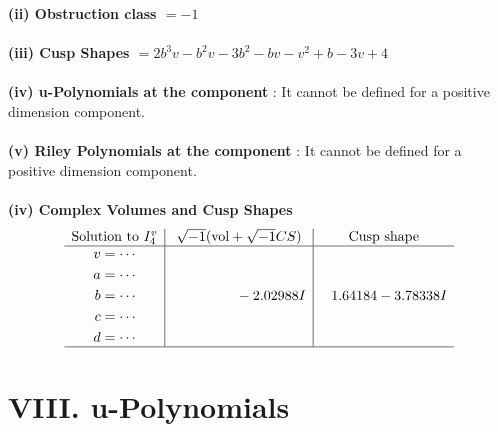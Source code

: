 \documentclass[1p]{elsarticle_modified}
\theoremstyle{definition}
\newcommand{\I}{\sqrt{-1}}
\begin{document}
\flushleft \textbf{(ii) Obstruction class $= -1$}\\~\\
\flushleft \textbf{(iii) Cusp Shapes $= 2 b^3 v- b^2 v-3 b^2- b v- v^2+b-3 v+4$}\\~\\
\flushleft \textbf{(iv) u-Polynomials at the component} : It cannot be defined for a positive dimension component.\\~\\
\flushleft \textbf{(v) Riley Polynomials at the component} : It cannot be defined for a positive dimension component.\\~\\
\newpage\flushleft \textbf{(iv) Complex Volumes and Cusp Shapes}
$$\begin{array}{c|c|c} 
\text{Solution to }I^v_{4}& \I (\text{vol} + \sqrt{-1}CS) & \text{Cusp shape}\\
 \hline 
\begin{aligned}
v &= \cdots \\
a &= \cdots \\
b &= \cdots \\
c &= \cdots \\
d &= \cdots\end{aligned}
 & \phantom{-0.000000 } -2.02988 I & \phantom{-}1.64184 - 3.78338 I\\
 \hline 
 \end{array}
$$
\newpage\renewcommand{\arraystretch}{1}
\centering \section*{ VIII. u-Polynomials}
\end{document}
